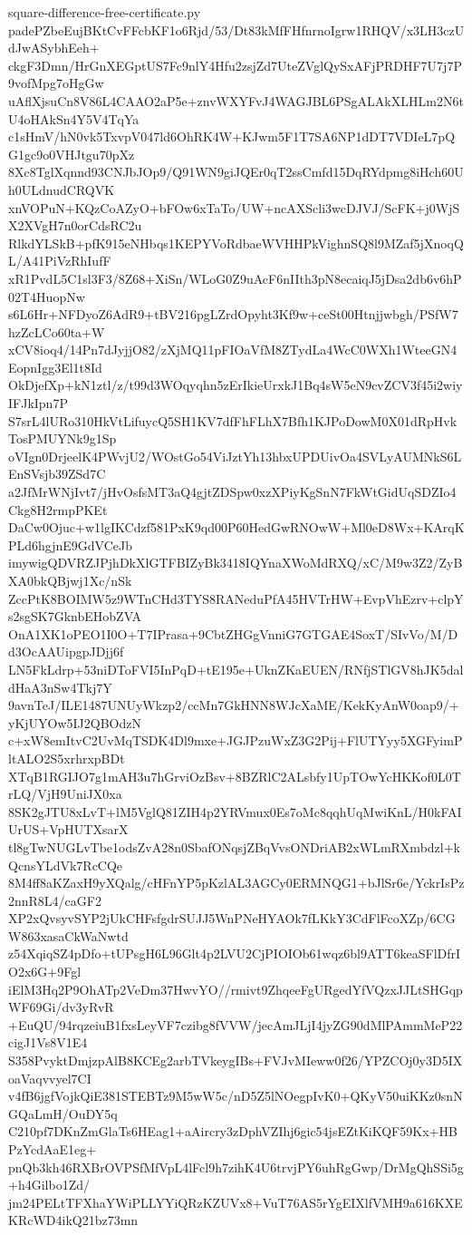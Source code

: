 \documentclass[11pt]{article}
\theoremstyle{definition}
\theoremstyle{remark}
\begin{document}
\begin{filecontents*}[overwrite]{square-difference-free-certificate.py}
padePZbeEujBKtCvFFcbKF1o6Rjd/53/Dt83kMfFHfnrnoIgrw1RHQV/x3LH3czUdJwASybhEeh+
ckgF3Dmn/HrGnXEGptUS7Fc9nlY4Hfu2zsjZd7UteZVglQySxAFjPRDHF7U7j7P9vofMpg7oHgGw
uAflXjsuCn8V86L4CAAO2aP5e+znvWXYFvJ4WAGJBL6PSgALAkXLHLm2N6tU4oHAkSn4Y5V4TqYa
c1sHmV/hN0vk5TxvpV047ld6OhRK4W+KJwm5F1T7SA6NP1dDT7VDIeL7pQG1gc9o0VHJtgu70pXz
8Xc8TglXqnnd93CNJbJOp9/Q91WN9giJQEr0qT2ssCmfd15DqRYdpmg8iHch60Uh0ULdnudCRQVK
xnVOPuN+KQzCoAZyO+bFOw6xTaTo/UW+ncAXScli3wcDJVJ/ScFK+j0WjSX2XVgH7n0orCdsRC2u
RlkdYLSkB+pfK915eNHbqs1KEPYVoRdbaeWVHHPkVighnSQ8l9MZaf5jXnoqQL/A41PiVzRhIufF
xR1PvdL5C1sl3F3/8Z68+XiSn/WLoG0Z9uAcF6nIIth3pN8ecaiqJ5jDsa2db6v6hP02T4HuopNw
s6L6Hr+NFDyoZ6AdR9+tBV216pgLZrdOpyht3Kf9w+ceSt00Htnjjwbgh/PSfW7hzZcLCo60ta+W
xCV8ioq4/14Pn7dJyjjO82/zXjMQ11pFIOaVfM8ZTydLa4WcC0WXh1WteeGN4EopnIgg3El1t8Id
OkDjefXp+kN1ztl/z/t99d3WOqyqhn5zErIkieUrxkJ1Bq4sW5eN9cvZCV3f45i2wiyIFJkIpn7P
S7srL4lURo310HkVtLifuycQ5SH1KV7dfFhFLhX7Bfh1KJPoDowM0X01dRpHvkTosPMUYNk9g1Sp
oVIgn0DrjeelK4PWvjU2/WOstGo54ViJztYh13hbxUPDUivOa4SVLyAUMNkS6LEnSVsjb39ZSd7C
a2JfMrWNjIvt7/jHvOsfsMT3aQ4gjtZDSpw0xzXPiyKgSnN7FkWtGidUqSDZIo4Ckg8H2rmpPKEt
DaCw0Ojuc+w1lgIKCdzf581PxK9qd00P60HedGwRNOwW+Ml0eD8Wx+KArqKPLd6hgjnE9GdVCeJb
imywigQDVRZJPjhDkXlGTFBIZyBk3418IQYnaXWoMdRXQ/xC/M9w3Z2/ZyBXA0bkQBjwj1Xc/nSk
ZccPtK8BOIMW5z9WTnCHd3TYS8RANeduPfA45HVTrHW+EvpVhEzrv+clpYs2sgSK7GknbEHobZVA
OnA1XK1oPEO1I0O+T7IPrasa+9CbtZHGgVnniG7GTGAE4SoxT/SIvVo/M/Dd3OcAAUipgpJDjj6f
LN5FkLdrp+53niDToFVI5InPqD+tE195e+UknZKaEUEN/RNfjSTlGV8hJK5daldHaA3nSw4Tkj7Y
9avnTeJ/ILE1487UNUyWkzp2/ccMn7GkHNN8WJcXaME/KekKyAnW0oap9/+yKjUYOw5IJ2QBOdzN
c+xW8emItvC2UvMqTSDK4Dl9mxe+JGJPzuWxZ3G2Pij+FlUTYyy5XGFyimPltALO2S5xrhrxpBDt
XTqB1RGIJO7g1mAH3u7hGrviOzBsv+8BZRlC2ALsbfy1UpTOwYcHKKof0L0TrLQ/VjH9UniJX0xa
8SK2gJTU8xLvT+lM5VglQ81ZIH4p2YRVmux0Es7oMc8qqhUqMwiKnL/H0kFAIUrUS+VpHUTXsarX
tl8gTwNUGLvTbe1odsZvA28n0SbafONqsjZBqVvsONDriAB2xWLmRXmbdzl+kQcnsYLdVk7RcCQe
8M4ff8aKZaxH9yXQalg/cHFnYP5pKzlAL3AGCy0ERMNQG1+bJlSr6e/YckrIsPz2nnR8L4/caGF2
XP2xQvsyvSYP2jUkCHFsfgdrSUJJ5WnPNeHYAOk7fLKkY3CdFlFcoXZp/6CGW863xasaCkWaNwtd
z54XqiqSZ4pDfo+tUPsgH6L96Glt4p2LVU2CjPIOIOb61wqz6bl9ATT6keaSFlDfrIO2x6G+9Fgl
iElM3Hq2P9OhATp2VeDm37HwvYO//rmivt9ZhqeeFgURgedYfVQzxJJLtSHGqpWF69Gi/dv3yRvR
+EuQU/94rqzeiuB1fxsLeyVF7czibg8fVVW/jecAmJLjI4jyZG90dMlPAmmMeP22cigJ1Vs8V1E4
S358PvyktDmjzpAlB8KCEg2arbTVkeygIBs+FVJvMIeww0f26/YPZCOj0y3D5IXoaVaqvvyel7CI
v4fB6jgfVojkQiE381STEBTz9M5wW5c/nD5Z5lNOegpIvK0+QKyV50uiKKz0snNGQaLmH/OuDY5q
C210pf7DKnZmGlaTs6HEag1+aAircry3zDphVZIhj6gic54jsEZtKiKQF59Kx+HBPzYcdAaE1eg+
pnQb3kh46RXBrOVPSfMfVpL4lFcl9h7zihK4U6trvjPY6uhRgGwp/DrMgQhSSi5g+h4Gilbo1Zd/
jm24PELtTFXhaYWiPLLYYiQRzKZUVx8+VuT76AS5rYgEIXlfVMH9a616KXEKRcWD4ikQ21bz73mn

\end{filecontents*}
\end{document}
